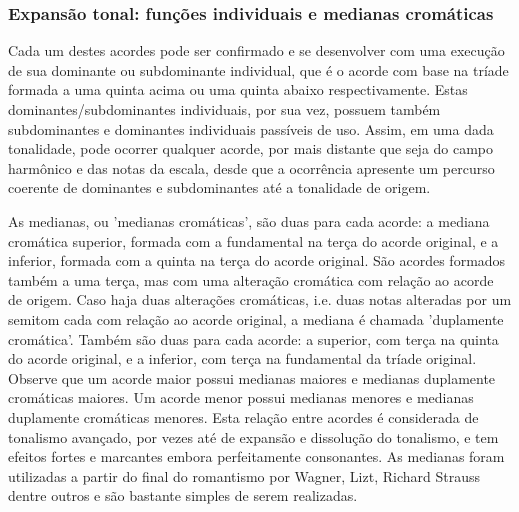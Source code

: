\subsubsection{Expansão tonal: funções individuais e medianas cromáticas}
Cada um destes acordes pode ser confirmado e se desenvolver com uma execução de sua dominante ou subdominante individual, que é o acorde com base na tríade formada a uma quinta acima ou uma quinta abaixo respectivamente. Estas dominantes/subdominantes individuais, por sua vez, possuem também subdominantes e dominantes individuais passíveis de uso. Assim, em uma dada tonalidade, pode ocorrer qualquer acorde, por mais distante que seja do campo harmônico e das notas da escala, desde que a ocorrência apresente um percurso coerente de dominantes e subdominantes até a tonalidade de origem.

As medianas, ou 'medianas cromáticas', são duas para cada acorde: a mediana cromática superior, formada com a fundamental na terça do acorde original, e a inferior, formada com a quinta na terça do acorde original. São acordes formados também a uma terça, mas com uma alteração cromática com relação ao acorde de origem. Caso haja duas alterações cromáticas, i.e. duas notas alteradas por um semitom cada com relação ao acorde original, a mediana é chamada 'duplamente cromática'. Também são duas para cada acorde: a superior, com terça na quinta do acorde original, e a inferior, com terça na fundamental da tríade original. Observe que um acorde maior possui medianas maiores e medianas duplamente cromáticas maiores. Um acorde menor possui medianas menores e medianas duplamente cromáticas menores. Esta relação entre acordes é considerada de tonalismo avançado, por vezes até de expansão e dissolução do tonalismo, e tem efeitos fortes e marcantes embora perfeitamente consonantes. As medianas foram utilizadas a partir do final do romantismo por Wagner, Lizt, Richard Strauss dentre outros e são bastante simples de serem realizadas.\cite{Harmonia,Salzer}

